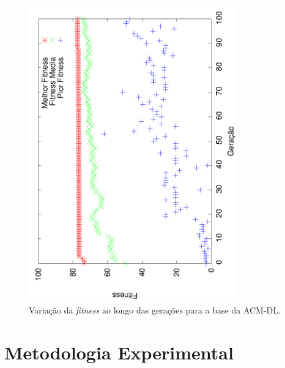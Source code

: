 \begin{figure}[h!]
  \centering
  \includegraphics[angle=270, width=0.80\textwidth]{figures/acm.png}
 \caption{Variação da \textit{fitness} ao longo das gerações para a base da \textsc{ACM-DL}.}
\label{fig::fitnessgen}
\end{figure}



\section{Metodologia Experimental}
\label{subsubsec::cv}


